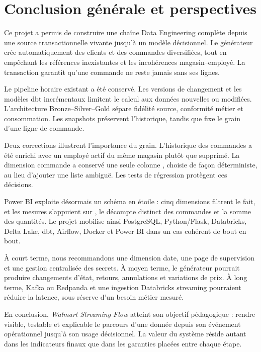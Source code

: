\chapter*{Conclusion générale et perspectives}

Ce projet a permis de construire une chaîne Data Engineering complète depuis une source transactionnelle vivante jusqu'à un modèle décisionnel. Le générateur crée automatiquement des clients et des commandes diversifiées, tout en empêchant les références inexistantes et les incohérences magasin--employé. La transaction garantit qu'une commande ne reste jamais sans ses lignes.

Le pipeline horaire existant a été conservé. Les versions de changement et les modèles dbt incrémentaux limitent le calcul aux données nouvelles ou modifiées. L'architecture Bronze--Silver--Gold sépare fidélité source, conformité métier et consommation. Les snapshots préservent l'historique, tandis que  fixe le grain d'une ligne de commande.

Deux corrections illustrent l'importance du grain. L'historique des commandes a été enrichi avec un employé actif du même magasin plutôt que supprimé. La dimension commande a conservé une seule colonne , choisie de façon déterministe, au lieu d'ajouter une liste ambiguë. Les tests de régression protègent ces décisions.

Power BI exploite désormais un schéma en étoile : cinq dimensions filtrent le fait, et les mesures s'appuient sur , le décompte distinct des commandes et la somme des quantités. Le projet mobilise ainsi PostgreSQL, Python/Flask, Databricks, Delta Lake, dbt, Airflow, Docker et Power BI dans un cas cohérent de bout en bout.

À court terme, nous recommandons une dimension date, une page de supervision et une gestion centralisée des secrets. À moyen terme, le générateur pourrait produire changements d'état, retours, annulations et variations de prix. À long terme, Kafka ou Redpanda et une ingestion Databricks streaming pourraient réduire la latence, sous réserve d'un besoin métier mesuré.

En conclusion, \emph{Walmart Streaming Flow} atteint son objectif pédagogique : rendre visible, testable et explicable le parcours d'une donnée depuis son événement opérationnel jusqu'à son usage décisionnel. La valeur du système réside autant dans les indicateurs finaux que dans les garanties placées entre chaque étape.

